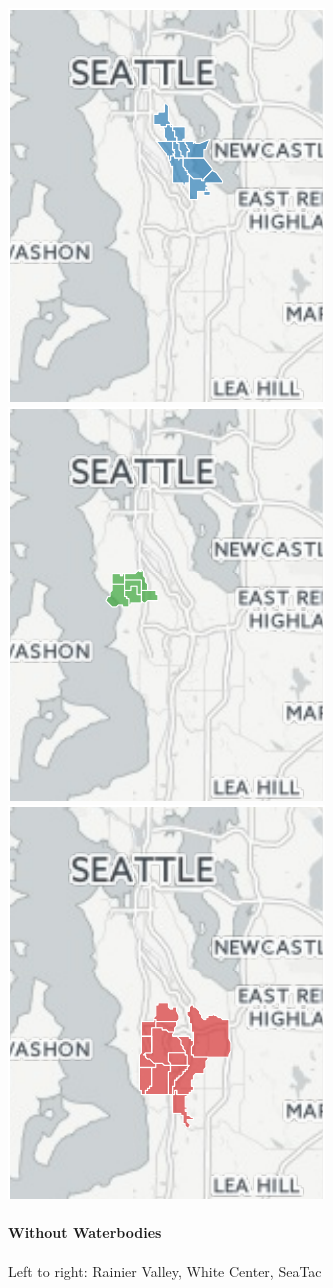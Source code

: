 \documentclass[]{article}
\let\oldparagraph\paragraph
\renewcommand{\paragraph}[1]{\oldparagraph{#1}\mbox{}}
\begin{document}
\includegraphics{tracts_files/figure-latex/unnamed-chunk-2-1.pdf}
\includegraphics{tracts_files/figure-latex/unnamed-chunk-2-2.pdf}
\includegraphics{tracts_files/figure-latex/unnamed-chunk-2-3.pdf}

\paragraph{Without Waterbodies}\label{without-waterbodies}

Left to right: Rainier Valley, White Center, SeaTac
\end{document}
